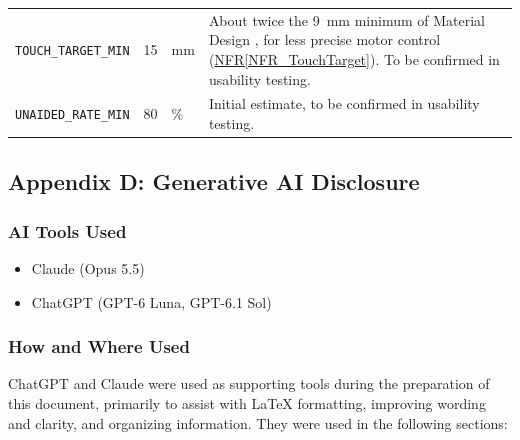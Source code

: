 \documentclass[10pt]{article}
\newcommand{\nfrref}[1]{\hyperref[#1]{NFR\ref*{#1}}}
\begin{document}
\begin{longtable}{>{\raggedright\arraybackslash}p{} p{} >{\raggedright\arraybackslash}p{} >{\raggedright\arraybackslash}p{}}
\texttt{TOUCH\_TARGET\_MIN}
\label{const:TOUCH_TARGET_MIN}
& 15 & mm & About twice the 9~mm minimum of Material Design \cite{MaterialDesign}, for less precise motor control (\nfrref{NFR_TouchTarget}). To be confirmed in usability testing. \\

\texttt{UNAIDED\_RATE\_MIN}
\label{const:UNAIDED_RATE_MIN}
& 80 & \% & Initial estimate, to be confirmed in usability testing. \\

\end{longtable}

\newpage
\subsection{Appendix D: Generative AI Disclosure}

\subsubsection*{AI Tools Used}

\begin{itemize}
    \item Claude (Opus 5.5)
    \item ChatGPT (GPT-6 Luna, GPT-6.1 Sol)
\end{itemize}

\subsubsection*{How and Where Used}

ChatGPT and Claude were used as supporting tools during the preparation of
this document, primarily to assist with \LaTeX{} formatting,
improving wording and clarity, and organizing information.
They were used in the following sections:
\end{document}
